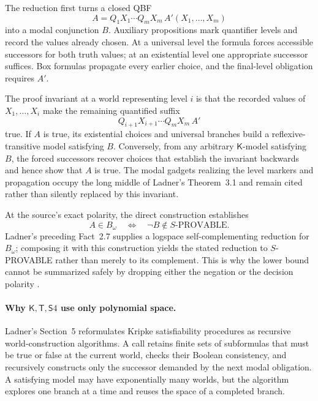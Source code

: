 The reduction first turns a closed QBF
\[
 A=Q_1X_1\cdots Q_mX_m\,A'(X_1,\ldots,X_m)
\]
into a modal conjunction \(B\).  Auxiliary propositions mark quantifier levels
and record the values already chosen.  At a universal level the formula forces
accessible successors for both truth values; at an existential level one
appropriate successor suffices.  Box formulas propagate every earlier choice,
and the final-level obligation requires \(A'\).

The proof invariant at a world representing level \(i\) is that the recorded
values of \(X_1,\ldots,X_i\) make the remaining quantified suffix
\[
 Q_{i+1}X_{i+1}\cdots Q_mX_m\,A'
\]
true.  If \(A\) is true, its existential choices and universal branches build a
reflexive-transitive model satisfying \(B\).  Conversely, from any arbitrary
\(\mathsf K\)-model satisfying \(B\), the forced successors recover choices
that establish the invariant backwards and hence show that \(A\) is true.
The modal gadgets realizing the level markers and propagation occupy the long
middle of Ladner's Theorem~3.1 and remain cited rather than silently replaced
by this invariant.

At the source's exact polarity, the direct construction establishes
\[
 A\in B_\omega
 \quad\Longleftrightarrow\quad
 \neg B\notin S\text{-PROVABLE}.
\]
Ladner's preceding Fact~2.7 supplies a logspace self-complementing reduction
for \(B_\omega\); composing it with this construction yields the stated
reduction to \(S\)-PROVABLE rather than merely to its complement.  This is why
the lower bound cannot be summarized safely by dropping either the negation or
the decision polarity \cite[thm.~3.1]{Ladner1977}.

\paragraph{Why \(\mathsf K,\mathsf T,\mathsf S4\) use only polynomial space.}
Ladner's Section~5 reformulates Kripke satisfiability procedures as recursive
world-construction algorithms.  A call retains finite sets of subformulas that
must be true or false at the current world, checks their Boolean consistency,
and recursively constructs only the successor demanded by the next modal
obligation.  A satisfying model may have exponentially many worlds, but the
algorithm explores one branch at a time and reuses the space of a completed
branch.

